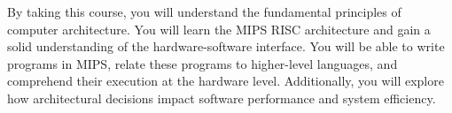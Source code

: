 By taking this course, you will understand the fundamental principles of computer architecture. You will learn the MIPS RISC architecture and gain a solid understanding of the hardware-software interface. You will be able to write programs in MIPS, relate these programs to higher-level languages, and comprehend their execution at the hardware level. Additionally, you will explore how architectural decisions impact software performance and system efficiency.